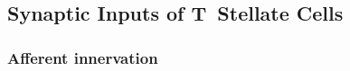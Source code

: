 \subsection{Synaptic Inputs of T~Stellate Cells}\label{sec:synaptic-inputs-tstellate}


\subsubsection{Afferent innervation}

